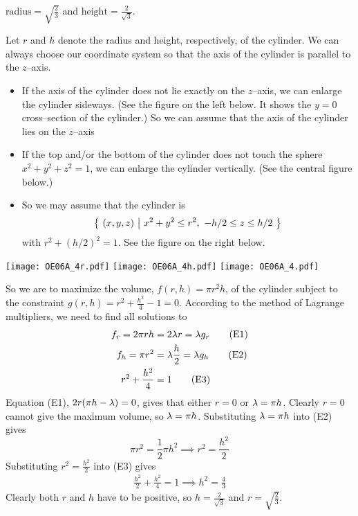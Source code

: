 \begin{answer}
$\text{radius}=\sqrt{\frac{2}{3}}$
and $\text{height}=\frac{2}{\sqrt{3}}$.
\end{answer}

\begin{solution}
 Let $r$ and $h$ denote the radius and height, respectively, of the cylinder. We can always choose our coordinate system so that the axis of
the cylinder is parallel to the $z$--axis.  
\begin{itemize}
\item
If the axis of the cylinder does
not lie exactly on the $z$--axis, we can enlarge the cylinder sideways.
(See the figure on the left below. It shows the $y=0$ cross--section of
the cylinder.) So we can assume that the axis of the cylinder lies on the $z$--axis  
\item
If the top and/or the bottom of the cylinder does not touch the sphere
$x^2+y^2+z^2=1$, we can enlarge the cylinder vertically. (See the
central figure below.) 
\item
So we may assume that the cylinder is
\begin{equation*}
\big\{ \ (x,y,z)\ \big|\ x^2+y^2\le r^2,\ -h/2\le z\le h/2\ \big\}
\end{equation*}
with $r^2+(h/2)^2=1$. See the figure on the right below.
\end{itemize}

\begin{center}
     \texttt{[image: OE06A\_4r.pdf]}\quad
     \texttt{[image: OE06A\_4h.pdf]}
     \texttt{[image: OE06A\_4.pdf]}
\end{center}

So we are to maximize the volume, $f(r,h) = \pi r^2 h$, of the cylinder
subject to the constraint $g(r,h) = r^2+ \frac{h^2}{4} -1=0$.
According to the method of Lagrange multipliers, we need to find 
all solutions to
\begin{align*}
f_r = 2\pi r h &=2 \lambda r = \lambda g_r \tag{E1} \\ 
f_h = \pi r^2 &= \lambda \frac{h}{2} = \lambda g_h \tag{E2} \\ 
r^2+ \frac{h^2}{4}&=1 \tag{E3}
\end{align*}
Equation (E1), $2r(\pi h-\lambda)=0$, gives that either $r=0$ or $\lambda=\pi h$. 
Clearly $r=0$ cannot give the maximum volume, so $\lambda=\pi h$.
Substituting $\lambda=\pi h$ into (E2) gives
\begin{equation*}
\pi r^2 = \frac{1}{2}\pi h^2
\implies r^2=\frac{h^2}{2}
\end{equation*}
Substituting $r^2=\frac{h^2}{2}$ into (E3) gives
\begin{align*}
\frac{h^2}{2} + \frac{h^2}{4} =1
\implies h^2 =\frac{4}{3}
\end{align*}
Clearly both $r$ and $h$ have to be positive, so $h=\frac{2}{\sqrt{3}}$
and $r=\sqrt{\frac{2}{3}}$.
\end{solution}


